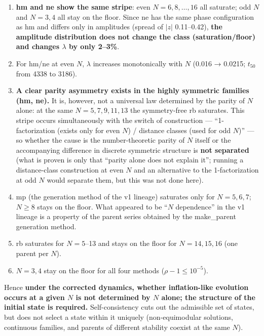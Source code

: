 \documentclass[
  10pt,
  a4paper,
]{article}
\providecommand{\tightlist}{%
  \setlength{\itemsep}{0pt}\setlength{\parskip}{0pt}}
\begin{document}
\begin{enumerate}
\def\labelenumi{\arabic{enumi}.}
\tightlist
\item
  \textbf{hm and ne show the same stripe}: even \(N=6,8,\dots,16\) all
  saturate; odd \(N\) and \(N=3,4\) all stay on the floor. Since ne has
  the same phase configuration as hm and differs only in amplitudes
  (spread of \(|z|\) 0.11--0.42), \textbf{the amplitude distribution
  does not change the class (saturation/floor) and changes \(\lambda\)
  by only 2--3\%}.
\item
  For hm/ne at even \(N\), \(\lambda\) increases monotonically with
  \(N\) (0.016 → 0.0215; \(t_{50}\) from 4338 to 3186).
\item
  \textbf{A clear parity asymmetry exists in the highly symmetric
  families (hm, ne).} It is, however, not a universal law determined by
  the parity of \(N\) alone: at the same \(N=5,7,9,11,13\) the
  symmetry-free rb saturates. This stripe occurs simultaneously with the
  switch of construction --- ``1-factorization (exists only for even
  \(N\)) / distance classes (used for odd \(N\))'' --- so whether the
  cause is the number-theoretic parity of \(N\) itself or the
  accompanying difference in discrete symmetric structure is \textbf{not
  separated} (what is proven is only that ``parity alone does not
  explain it''; running a distance-class construction at even \(N\) and
  an alternative to the 1-factorization at odd \(N\) would separate
  them, but this was not done here).
\item
  mp (the generation method of the v1 lineage) saturates only for
  \(N=5,6,7\); \(N\ge8\) stays on the floor. What appeared to be ``\(N\)
  dependence'' in the v1 lineage is a property of the parent series
  obtained by the make\_parent generation method.
\item
  rb saturates for \(N=5\)--13 and stays on the floor for \(N=14,15,16\)
  (one parent per \(N\)).
\item
  \(N=3,4\) stay on the floor for all four methods
  (\(\rho-1\le10^{-5}\)).
\end{enumerate}

Hence \textbf{under the corrected dynamics, whether inflation-like
evolution occurs at a given \(N\) is not determined by \(N\) alone; the
structure of the initial state is required.} Self-consistency cuts out
the admissible set of states, but does not select a state within it
uniquely (non-equimodular solutions, continuous families, and parents of
different stability coexist at the same \(N\)).
\end{document}
